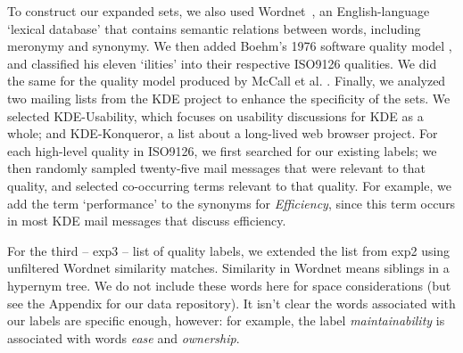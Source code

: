 \documentclass[10pt, conference, compsocconf]{IEEEtran}
\begin{document}
To construct our expanded sets, we also used Wordnet~\cite{Fellbaum1998}, an English-language ‘lexical database’ that contains semantic relations between words, including meronymy and synonymy. We then added Boehm’s 1976 software quality model \cite{Boehm+:1976:ICSE}, and classified his eleven ‘ilities’ into their respective ISO9126 qualities. We did the same for the quality model produced by McCall et al. \cite{mccall1977}. Finally, we analyzed two mailing lists from the KDE project to enhance the specificity of the sets. We selected KDE-Usability, which focuses on usability discussions for KDE as a whole; and KDE-Konqueror, a list about a long-lived web browser project. For each high-level quality in ISO9126, we first searched for our existing labels; we then randomly sampled twenty-five mail messages that were relevant to that quality, and selected co-occurring terms relevant to that quality. For example, we add the term ‘performance’ to the synonyms for \emph{Efficiency}, since this term occurs in most KDE mail messages that discuss efficiency.

For the third -- \textsf{exp3} -- list of quality labels, we extended the list from \textsf{exp2} using unfiltered Wordnet similarity matches. Similarity in Wordnet means siblings in a hypernym tree. We do not include these words here for space considerations (but see the Appendix for our data repository). It isn't clear the words associated with our labels are specific enough, however: for example, the label \emph{maintainability} is associated with words \emph{ease} and \emph{ownership}.
\end{document}
